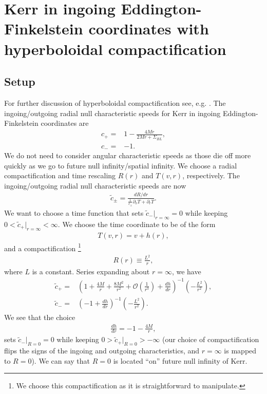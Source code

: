 \documentclass[12pt]{report}
\begin{document}
\section{Kerr in ingoing Eddington-Finkelstein coordinates with
hyperboloidal compactification}
\subsection{Setup}
	For further discussion of hyperboloidal compactification see, e.g.
\cite{Zenginoglu_2008}.
The ingoing/outgoing radial null characteristic speeds for
Kerr in ingoing Eddington-Finkelstein coordinates are
\begin{subequations}
\begin{align}
	c_+
	= &
	1
-	\frac{4Mr}{2Mr+\Sigma_{BL}}
	, \\
	c_-
	= &
	-1
	.
\end{align}
\end{subequations}
	We do not need to consider angular characteristic speeds as those
die off more quickly as we go to future null infinity/spatial infinity.
We choose a radial compactification and time rescaling
$R(r)$ and $T(v,r)$, respectively.
The ingoing/outgoing radial null characteristic speeds are now
\begin{align}
	\tilde{c}_{\pm}
	=
	\frac{dR/dr}{\frac{1}{c_{\pm}}\partial_vT+\partial_rT}
	.
\end{align}
	We want to choose a time function that sets
$\tilde{c}_-|_{r=\infty}=0$ while keeping $0<\tilde{c}_+|_{r=\infty}<\infty$.
We choose the time coordinate to be of the form
\begin{align}
	T(v,r) 
	= 
	v + h(r) 
	, 
\end{align}
	and a compactification
\footnote{We choose this compactification
as it is straightforward to manipulate.}
\begin{align}
	R(r) \equiv \frac{L^2}{r}
	,
\end{align}
	where $L$ is a constant.
Series expanding about $r=\infty$, we have
\begin{subequations}
\begin{align}
	\tilde{c}_+
	= &
	\left(
		1+\frac{4M}{r}+\frac{8M^2}{r^2}
	+	\mathcal{O}\left(\frac{1}{r^3}\right)
	+	\frac{dh}{dr}
	\right)^{-1}
	\left(-\frac{L^2}{r^2}\right)
	, \\
	\tilde{c}_-
	= &
	\left(-1+\frac{dh}{dr}\right)^{-1}
	\left(-\frac{L^2}{r^2}\right)	
	.
\end{align}
\end{subequations}
	We see that the choice
\begin{align}
	\frac{dh}{dr} = -1 - \frac{4M}{r}
	,
\end{align}
	sets
$\tilde{c}_-|_{R=0}=0$ while keeping
$0>\tilde{c}_+|_{R=0}>-\infty$ (our choice of compactification
flips the signs of the ingoing and outgoing characteristics, and
$r=\infty$ is mapped to $R=0$). We can say that $R=0$ is located
``on'' future null infinity of Kerr.
\end{document}

